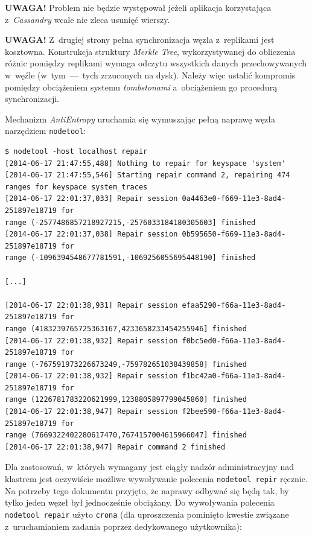 \documentclass{article} %
\begin{document}
\bigskip

\noindent\textbf{UWAGA!} Problem nie będzie występował jeżeli aplikacja korzystająca z~\emph{Cassandry} wcale nie zleca usunięć wierszy.

\bigskip

\noindent\textbf{UWAGA!} Z~drugiej strony pełna synchronizacja węzła z~replikami jest kosztowna.
Konstrukcja struktury \emph{Merkle Tree}, wykorzystywanej do obliczenia różnic pomiędzy replikami wymaga odczytu wszystkich danych przechowywanych w~węźle (w~tym~---~tych zrzuconych na dysk).
Należy więc ustalić kompromis pomiędzy obciążeniem systemu \emph{tombstonami} a~obciążeniem go procedurą synchronizacji.

Mechanizm \emph{AntiEntropy} uruchamia się wymuszając pełną naprawę węzła narzędziem \texttt{nodetool}:

\begin{lstlisting}[style=bash, caption={naprawa węzła poprzez uruchomienie mechanizmu \emph{AntiEntropy}}]
$ nodetool -host localhost repair
[2014-06-17 21:47:55,488] Nothing to repair for keyspace 'system'
[2014-06-17 21:47:55,546] Starting repair command 2, repairing 474
ranges for keyspace system_traces
[2014-06-17 22:01:37,033] Repair session 0a4463e0-f669-11e3-8ad4-251897e18719 for
range (-2577486857218927215,-2576033184180305603] finished
[2014-06-17 22:01:37,038] Repair session 0b595650-f669-11e3-8ad4-251897e18719 for
range (-1096394548677781591,-1069256055695448190] finished

[...]

[2014-06-17 22:01:38,931] Repair session efaa5290-f66a-11e3-8ad4-251897e18719 for
range (4183239765725363167,4233658233454255946] finished
[2014-06-17 22:01:38,932] Repair session f0bc5ed0-f66a-11e3-8ad4-251897e18719 for
range (-767591973226673249,-759782651038439858] finished
[2014-06-17 22:01:38,932] Repair session f1bc42a0-f66a-11e3-8ad4-251897e18719 for
range (1226781783220621999,1238805897799045860] finished
[2014-06-17 22:01:38,947] Repair session f2bee590-f66a-11e3-8ad4-251897e18719 for
range (7669322402280617470,7674157004615966047] finished
[2014-06-17 22:01:38,947] Repair command 2 finished
\end{lstlisting}

Dla zastosowań, w~których wymagany jest ciągły nadzór administracyjny nad klastrem jest oczywiście możliwe wywoływanie polecenia \texttt{nodetool repir} ręcznie.
Na potrzeby tego dokumentu przyjęto, że naprawy odbywać się będą tak, by tylko jeden węzeł był jednocześnie obciążany.
Do wywoływania polecenia \texttt{nodetool repair} użyto \texttt{crona} (dla uproszczenia pominięto kwestie związane z~uruchamianiem zadania poprzez dedykowanego użytkownika):
\end{document}
